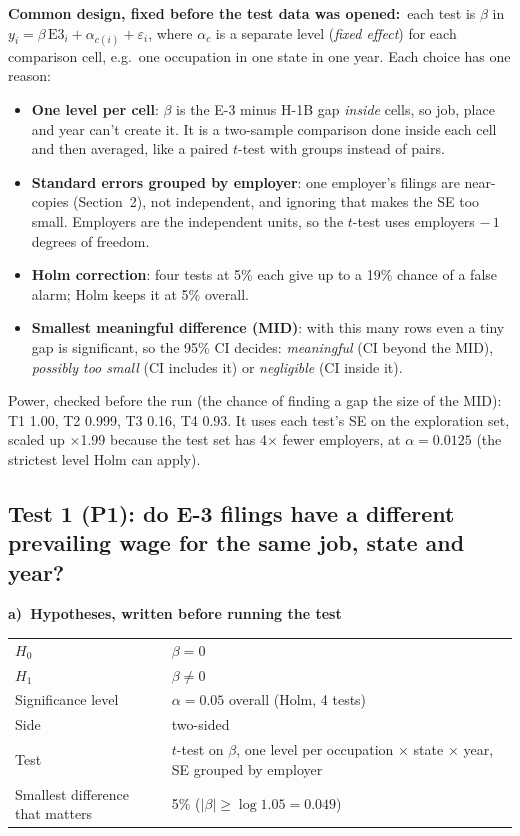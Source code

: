 \documentclass[10pt,a4paper,twocolumn]{article}
\newcommand{\field}[2]{\textbf{#1}~#2\par}
\newcommand{\tpart}[2]{\par\needspace{12\baselineskip}\smallskip\textbf{#1)~#2}\par}
\begin{document}
\field{Common design, fixed before the test data was opened:}{each test is $\beta$ in
$y_i=\beta\,\mathrm{E3}_i+\alpha_{c(i)}+\varepsilon_i$, where $\alpha_c$ is a separate level
(\emph{fixed effect}) for each comparison cell, e.g.\ one occupation in one state in one year.
Each choice has one reason:}
\begin{itemize}[leftmargin=*,itemsep=1pt,topsep=1pt]
  \item \textbf{One level per cell}: $\beta$ is the E-3 minus H-1B gap \emph{inside} cells, so job,
  place and year can't create it. It is a two-sample comparison done inside each cell and then
  averaged, like a paired $t$-test with groups instead of pairs.
  \item \textbf{Standard errors grouped by employer}: one employer's filings are near-copies
  (Section~2), not independent, and ignoring that makes the SE too small. Employers are the
  independent units, so the $t$-test uses employers $-\,1$ degrees of freedom.
  \item \textbf{Holm correction}: four tests at 5\% each give up to a 19\% chance of a false
  alarm; Holm keeps it at 5\% overall.
  \item \textbf{Smallest meaningful difference (MID)}: with this many rows even a tiny gap is
  significant, so the 95\% CI decides: \emph{meaningful} (CI beyond the MID), \emph{possibly too
  small} (CI includes it) or \emph{negligible} (CI inside it).
\end{itemize}
Power, checked before the run (the chance of finding a gap the size of the MID): T1 1.00,
T2 0.999, T3 0.16, T4 0.93. It uses each test's SE on the exploration set, scaled up $\times$1.99
because the test set has 4$\times$ fewer employers, at $\alpha=0.0125$ (the strictest level Holm
can apply).

\clearpage
\subsection*{Test 1 (P1): do E-3 filings have a different prevailing wage for the same job,
state and year?}

\tpart{a}{Hypotheses, written before running the test}
{\small
\begin{tabularx}{\linewidth}{@{}K{3.4cm} Y@{}}
\toprule
$H_0$ & $\beta=0$ \\
$H_1$ & $\beta\neq0$ \\
Significance level & $\alpha=0.05$ overall (Holm, 4 tests) \\
Side & two-sided \\
Test & $t$-test on $\beta$, one level per occupation $\times$ state $\times$ year, SE grouped by employer \\
Smallest difference that matters & 5\% ($|\beta|\ge\log1.05=0.049$) \\
\bottomrule
\end{tabularx}}
\end{document}
